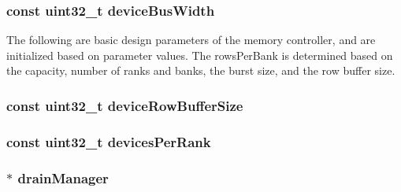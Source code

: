 \hypertarget{classDRAMCtrl_a9b8ba3e3a3cc11b904cd1b70e7a40ea5}{
\subsubsection[{deviceBusWidth}]{\setlength{\rightskip}{0pt plus 5cm}const {\bf uint32\_\-t} {\bf deviceBusWidth}}}
\label{classDRAMCtrl_a9b8ba3e3a3cc11b904cd1b70e7a40ea5}
The following are basic design parameters of the memory controller, and are initialized based on parameter values. The rowsPerBank is determined based on the capacity, number of ranks and banks, the burst size, and the row buffer size. \hypertarget{classDRAMCtrl_afdaeeb74e1622ca1cc0f00dcf937a3b0}{
\subsubsection[{deviceRowBufferSize}]{\setlength{\rightskip}{0pt plus 5cm}const {\bf uint32\_\-t} {\bf deviceRowBufferSize}}}
\label{classDRAMCtrl_afdaeeb74e1622ca1cc0f00dcf937a3b0}
\hypertarget{classDRAMCtrl_a962c654402093dcbdd4b40fd32c0de69}{
\subsubsection[{devicesPerRank}]{\setlength{\rightskip}{0pt plus 5cm}const {\bf uint32\_\-t} {\bf devicesPerRank}}}
\label{classDRAMCtrl_a962c654402093dcbdd4b40fd32c0de69}
\hypertarget{classDRAMCtrl_a329b71fb934a93312ca0aacbf5a3f982}{
\subsubsection[{drainManager}]{$\ast$ {\bf drainManager}}}
